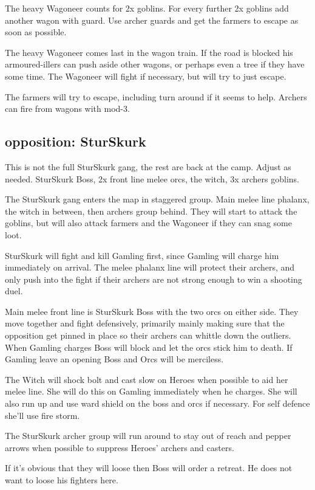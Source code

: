 The heavy Wagoneer counts for 2x goblins. For every further 2x goblins add another wagon with guard. Use archer guards and get the farmers to escape as soon as possible.

The heavy Wagoneer comes last in the wagon train. If the road is blocked his armoured-illers can push aside other wagons, or perhaps even a tree if they have some time. The Wagoneer will fight if necessary, but will try to just escape.

The farmers will try to escape, including turn around if it seems to help. Archers can fire from wagons with mod-3.


\subsection*{opposition: SturSkurk}

This is not the full SturSkurk gang, the rest are back at the camp. Adjust as needed. SturSkurk Boss, 2x front line melee orcs, the witch, 3x archers goblins.

The SturSkurk gang enters the map in staggered group. Main melee line phalanx, the witch in between, then archers group behind.
They will start to attack the goblins, but will also attack farmers and the Wagoneer if they can snag some loot.

SturSkurk will fight and kill Gamling first, since Gamling will charge him immediately on arrival. The melee phalanx line will protect their archers, and only push into the fight if their archers are not strong enough to win a shooting duel.

Main melee front line is SturSkurk Boss with the two orcs on either side. They move together and fight defensively, primarily mainly making sure that the opposition get pinned in place so their archers can whittle down the outliers. When Gamling charges Boss will block and let the orcs stick him to death. If Gamling leave an opening Boss and Orcs will be merciless.

The Witch will shock bolt and cast slow on Heroes when possible to aid her melee line. She will do this on Gamling immediately when he charges. She will also run up and use ward shield on the boss and orcs if necessary. For self defence she'll use fire storm.

The SturSkurk archer group will run around to stay out of reach and pepper arrows when possible to suppress Heroes' archers and casters.

If it's obvious that they will loose then Boss will order a retreat. He does not want to loose his fighters here.


